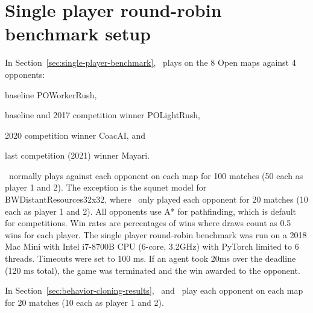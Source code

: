 \documentclass[conference,onecolumn]{IEEEtran}
\newcommand{\mapname}[1]{#1} %
\begin{document}
\section{Single player round-robin benchmark setup}
\label{appendix:single-player-benchmark-setup}
In Section~\ref{sec:single-player-benchmark}, \agentName\ plays on the 8 Open maps
against 4 opponents:
\begin{inparaenum}[(1)]
    \item baseline POWorkerRush,
    \item baseline and 2017 competition winner POLightRush,
    \item 2020 competition winner CoacAI, and
    \item last competition (2021) winner Mayari.
\end{inparaenum}
\agentName\ normally plays against each opponent on each map for 100 matches (50
each as player 1 and 2). The exception is the squnet model for \mapname{BWDistantResources32x32},
where \agentName\ only played each opponent for 20 matches (10 each as player 1 and 2).
All opponents use A* for pathfinding, which is default for competitions.  Win rates are 
percentages of wins where draws count as 0.5 wins for each player. The single player 
round-robin benchmark was run on a 2018 Mac Mini with Intel i7-8700B CPU (6-core, 
3.2GHz) with PyTorch limited to 6 threads. Timeouts were set to 100 ms. If
an agent took 20ms over the deadline (120 ms total), the game was terminated and the win
awarded to the opponent.

In Section~\ref{sec:behavior-cloning-results}, \bcAgent\ and \bcPPOAgent\ play each
opponent on each map for 20 matches
(10 each as player 1 and 2).
\end{document}
